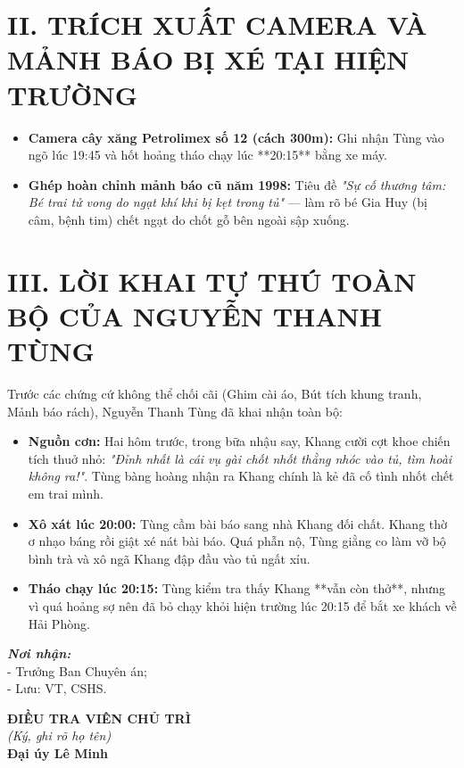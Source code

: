 \documentclass[12pt,a4paper]{article}
\begin{document}
\section*{II. TRÍCH XUẤT CAMERA VÀ MẢNH BÁO BỊ XÉ TẠI HIỆN TRƯỜNG}
\begin{itemize}[leftmargin=1.5cm]
    \item \textbf{Camera cây xăng Petrolimex số 12 (cách 300m):} Ghi nhận Tùng vào ngõ lúc 19:45 và hốt hoảng tháo chạy lúc **20:15** bằng xe máy.
    \item \textbf{Ghép hoàn chỉnh mảnh báo cũ năm 1998:} Tiêu đề \textit{"Sự cố thương tâm: Bé trai tử vong do ngạt khí khi bị kẹt trong tủ"} — làm rõ bé Gia Huy (bị câm, bệnh tim) chết ngạt do chốt gỗ bên ngoài sập xuống.
\end{itemize}

\section*{III. LỜI KHAI TỰ THÚ TOÀN BỘ CỦA NGUYỄN THANH TÙNG}
\noindent Trước các chứng cứ không thể chối cãi (Ghim cài áo, Bút tích khung tranh, Mảnh báo rách), Nguyễn Thanh Tùng đã khai nhận toàn bộ:
\begin{itemize}[leftmargin=1.5cm]
    \item \textbf{Nguồn cơn:} Hai hôm trước, trong bữa nhậu say, Khang cười cợt khoe chiến tích thuở nhỏ: \textit{"Đỉnh nhất là cái vụ gài chốt nhốt thằng nhóc vào tủ, tìm hoài không ra!"}. Tùng bàng hoàng nhận ra Khang chính là kẻ đã cố tình nhốt chết em trai mình.
    \item \textbf{Xô xát lúc 20:00:} Tùng cầm bài báo sang nhà Khang đối chất. Khang thờ ơ nhạo báng rồi giật xé nát bài báo. Quá phẫn nộ, Tùng giằng co làm vỡ bộ bình trà và xô ngã Khang đập đầu vào tủ ngất xỉu.
    \item \textbf{Tháo chạy lúc 20:15:} Tùng kiểm tra thấy Khang **vẫn còn thở**, nhưng vì quá hoảng sợ nên đã bỏ chạy khỏi hiện trường lúc 20:15 để bắt xe khách về Hải Phòng.
\end{itemize}

\vspace{0.8cm}

\noindent
\begin{minipage}[t]{0.45\textwidth}
    \small
    \textbf{\textit{Nơi nhận:}}\\
    - Trưởng Ban Chuyên án;\\
    - Lưu: VT, CSHS.
\end{minipage}
\hfill
\begin{minipage}[t]{0.5\textwidth}
    \begin{center}
        \small
        \textbf{ĐIỀU TRA VIÊN CHỦ TRÌ}\\
        \textit{(Ký, ghi rõ họ tên)}\\[1.5cm]
        \textbf{Đại úy Lê Minh}
    \end{center}
\end{minipage}
\end{document}
